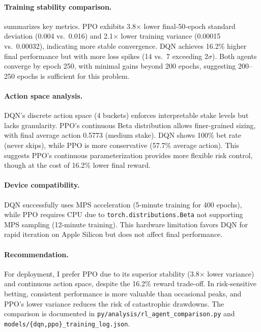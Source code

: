 \paragraph{Training stability comparison.}  summarizes key metrics. PPO exhibits 3.8$\times$ lower final-50-epoch standard deviation (0.004 vs.\ 0.016) and 2.1$\times$ lower training variance (0.00015 vs.\ 0.00032), indicating more stable convergence. DQN achieves 16.2\% higher final performance but with more loss spikes (14 vs.\ 7 exceeding 2$\sigma$). Both agents converge by epoch 250, with minimal gains beyond 200 epochs, suggesting 200--250 epochs is sufficient for this problem.

\paragraph{Action space analysis.} DQN's discrete action space (4 buckets) enforces interpretable stake levels but lacks granularity. PPO's continuous Beta distribution allows finer-grained sizing, with final average action 0.5773 (medium stake). DQN shows 100\% bet rate (never skips), while PPO is more conservative (57.7\% average action). This suggests PPO's continuous parameterization provides more flexible risk control, though at the cost of 16.2\% lower final reward.

\paragraph{Device compatibility.} DQN successfully uses MPS acceleration (5-minute training for 400 epochs), while PPO requires CPU due to \texttt{torch.distributions.Beta} not supporting MPS sampling (12-minute training). This hardware limitation favors DQN for rapid iteration on Apple Silicon but does not affect final performance.

\paragraph{Recommendation.} For deployment, I prefer PPO due to its superior stability (3.8$\times$ lower variance) and continuous action space, despite the 16.2\% reward trade-off. In risk-sensitive betting, consistent performance is more valuable than occasional peaks, and PPO's lower variance reduces the risk of catastrophic drawdowns. The comparison is documented in \texttt{py/analysis/rl\_agent\_comparison.py} and \texttt{models/\{dqn,ppo\}\_training\_log.json}.

